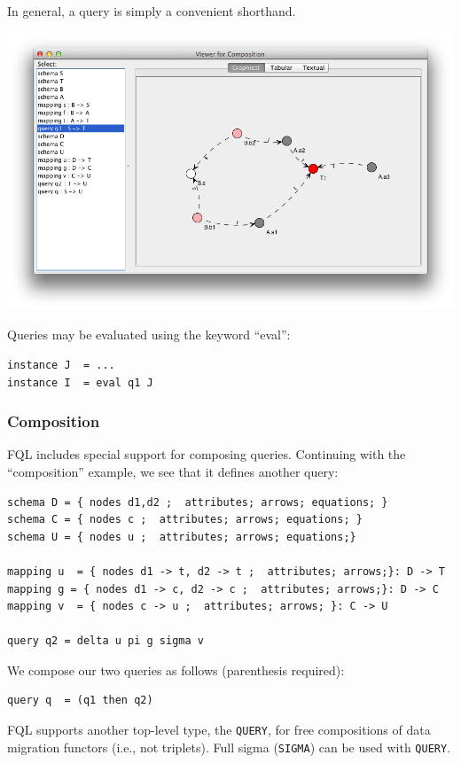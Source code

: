 \documentclass[12pt]{article}
\begin{document}
In general, a query is simply a convenient shorthand.

\begin{center}
\includegraphics[width=6in]{composition}
\end{center}
 Queries may be evaluated using the keyword ``eval'':
\begin{verbatim}
instance J  = ...
instance I  = eval q1 J
\end{verbatim}

\subsubsection{Composition}
FQL includes special support for composing queries.  Continuing with the ``composition'' example, we see that it defines another query:

\begin{verbatim}
schema D = { nodes d1,d2 ;  attributes; arrows; equations; }
schema C = { nodes c ;  attributes; arrows; equations; }
schema U = { nodes u ;  attributes; arrows; equations;}

mapping u  = { nodes d1 -> t, d2 -> t ;  attributes; arrows;}: D -> T
mapping g = { nodes d1 -> c, d2 -> c ;  attributes; arrows;}: D -> C 
mapping v  = { nodes c -> u ;  attributes; arrows; }: C -> U

query q2 = delta u pi g sigma v
\end{verbatim}
We compose our two queries as follows (parenthesis required):
\begin{verbatim}
query q  = (q1 then q2)
\end{verbatim}
FQL supports another top-level type, the {\tt QUERY}, for free compositions of data migration functors (i.e., not triplets).  Full sigma ({\tt SIGMA}) can be used with {\tt QUERY}.
\end{document}
